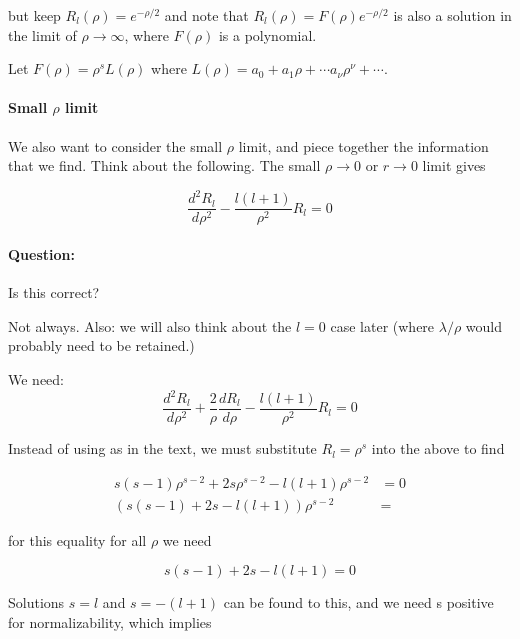 but keep \(R_l(\rho) = e^{-\rho/2}\) and note that \(R_l(\rho) = F(\rho)e^{-\rho/2}\) is also a solution in the limit of \(\rho \rightarrow \infty\), where \(F(\rho)\) is a polynomial.

Let \(F(\rho) = \rho^s L(\rho)\) where \(L(\rho) = a_0 + a_1 \rho + \cdots a_\nu \rho^\nu + \cdots\).

\paragraph{Small \texorpdfstring{\(\rho\)}{rho} limit}

We also want to consider the small \(\rho\) limit, and piece together the information that we find.  Think about the following.  The small \(\rho \rightarrow 0\) or \(r \rightarrow 0\) limit gives

\begin{equation}\label{eqn:PHY356FLecture10:140}
\frac{d^2 R_l}{d\rho^2} - \frac{l(l+1)}{\rho^2} R_l = 0
\end{equation}

\paragraph{Question:} Is this correct?

Not always.  Also: we will also think about the \(l=0\) case later (where \(\lambda/\rho\) would probably need to be retained.)

We need:
\begin{equation}\label{eqn:PHY356FLecture10:140b}
\frac{d^2 R_l}{d\rho^2} + \frac{2}{\rho} \frac{d R_l}{d\rho} - \frac{l(l+1)}{\rho^2} R_l = 0
\end{equation}

Instead of using  as in the text, we must substitute \(R_l = \rho^s\) into the above to find

\begin{align}\label{eqn:PHY356FLecture10:150}
s(s-1) \rho^{s-2} + 2 s \rho^{s-2} - l(l+1) \rho^{s-2} &= 0 \\
\left( s(s-1) + 2 s - l(l+1) \right) \rho^{s-2} &=
\end{align}

for this equality for all \(\rho\) we need

\begin{equation}\label{eqn:PHY356FLecture10:160}
s(s-1) + 2 s - l(l+1) = 0
\end{equation}

Solutions \(s = l\) and \(s = -(l+1)\) can be found to this, and we need s positive for normalizability, which implies

